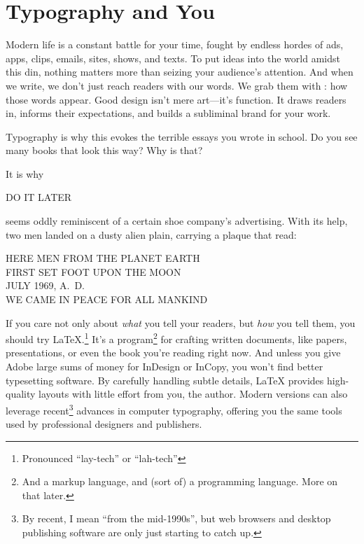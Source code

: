 \chapter{Typography and You}
\label{typography}

Modern life is a constant battle for your time,
fought by endless hordes of ads, apps, clips, emails, sites, shows, and texts.
To put ideas into the world amidst this din,
nothing matters more than seizing
your audience's attention.
And when we write, we don't just reach readers with our words.
We grab them with : how those words appear.
Good design isn't mere art---it's function.
It draws readers in,
informs their expectations, and builds a subliminal brand for your
work.\punckern{}
\begin{leftfigure}
\fontsize{12bp}{24bp}\selectfont\raggedright
Typography is why this evokes the terrible essays
you wrote in school.
Do you see many books that look this way?
Why is that?
\end{leftfigure}
\medskip

\noindent It is why
\begin{leftfigure}
\Large DO IT LATER
\end{leftfigure}
seems oddly reminiscent of a certain shoe company's advertising.
With its help,\punckern{}
two men landed on a dusty alien plain, carrying a plaque that read:
\begin{center}
HERE MEN FROM THE PLANET EARTH \\
FIRST SET FOOT UPON THE MOON \\
JULY 1969, A.~D. \\
WE CAME IN PEACE FOR ALL MANKIND
\end{center}

If you care not only about \emph{what} you tell your readers, but \emph{how}
you tell them, you should try \LaTeX.\punckern\footnote{Pronounced ``lay-tech''
or ``lah-tech''}
It's a program\footnote{And a markup language,
and (sort of) a programming language.
More on that later.}
for crafting written documents, like papers, presentations,
or even the book you're reading right now.
And unless you give Adobe large sums
of money for InDesign or InCopy,
you won't find better typesetting software.
By carefully handling subtle details,
\LaTeX{} provides high-quality layouts
with little effort from you, the author.
Modern versions can also leverage recent\footnote{By recent,
I mean ``from the mid-1990s''\quotekern, but web browsers and desktop publishing
software are only just starting to catch up.} advances in computer typography,
offering you the same tools used by professional designers and publishers.


